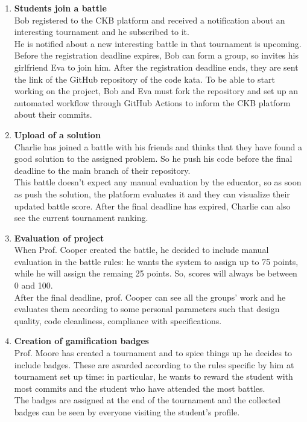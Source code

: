 \begin{enumerate}
    \item \textbf{Students join a battle} \\
    Bob registered to the CKB platform and received a notification about an interesting tournament 
    and he subscribed to it. \\
    He is notified about a new interesting battle in that tournament is upcoming. Before the registration 
    deadline expires, Bob can form a group, so invites his girlfriend Eva to join him. After the registration 
    deadline ends, they are sent the link of the GitHub repository of the code kata. To be able to start 
    working on the project, Bob and Eva must fork the repository and set up an automated workflow through 
    GitHub Actions to inform the CKB platform about their commits.\\

    \item \textbf{Upload of a solution} \\
    Charlie has joined a battle with his friends and thinks that they have found a good solution to 
    the assigned problem. So he push his code before the final deadline to the main branch of their 
    repository. \\This battle doesn't expect any manual evaluation by the educator, so as soon as 
    push the solution, the platform evaluates it and they can visualize their updated battle score. 
    After the final deadline has expired, Charlie can also see the current tournament ranking. \\

    \item \textbf{Evaluation of project}\\
    When Prof. Cooper created the battle, he decided to include manual evaluation in the battle rules: 
    he wants the system to assign up to 75 points, while he will assign the remaing 25 points. 
    So, scores will always be between 0 and 100.\\
    After the final deadline, prof. Cooper can see all the groups' work and he evaluates them according 
    to some personal parameters such that design quality, code cleanliness, compliance with specifications.\\

    \item \textbf{Creation of gamification badges}\\
    Prof. Moore has created a tournament and to spice things up he decides to include badges. 
    These are awarded according to the rules specific by him at tournament set up time: in particular, 
    he wants to reward the student with most commits and the student who have attended the most battles.\\
    The badges are assigned at the end of the tournament and the collected badges can be seen by everyone 
    visiting the student's profile. \\
\end{enumerate}

